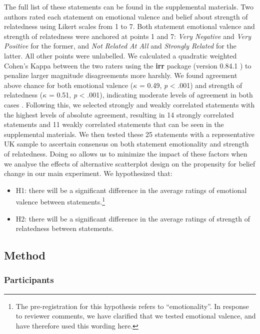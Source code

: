 \documentclass[sigconf]{acmart}
\providecommand{\tightlist}{%
  \setlength{\itemsep}{0pt}\setlength{\parskip}{0pt}}\usepackage{longtable,booktabs,array}
\begin{document}
The full list of these statements can be found in the supplemental
materials. Two authors rated each statement on emotional valence and
belief about strength of relatedness using Likert scales from 1 to 7.
Both statement emotional valence and strength of relatedness were
anchored at points 1 and 7: \emph{Very Negative} and \emph{Very
Positive} for the former, and \emph{Not Related At All} and
\emph{Strongly Related} for the latter. All other points were
unlabelled. We calculated a quadratic weighted Cohen's Kappa between the
two raters using the \textbf{irr} package (version 0.84.1 \citep{irr})
to penalize larger magnitude disagreements more harshly. We found
agreement above chance for both emotional valence (\(\kappa\) = 0.49,
\emph{p} \textless{} .001) and strength of relatedness (\(\kappa\) =
0.51, \emph{p} \textless{} .001), indicating moderate levels of
agreement in both cases \citep{cohen_1968, fleiss_1969}. Following this,
we selected strongly and weakly correlated statements with the highest
levels of absolute agreement, resulting in 14 strongly correlated
statements and 11 weakly correlated statements that can be seen in the
supplemental materials. We then tested these 25 statements with a
representative UK sample to ascertain consensus on both statement
emotionality and strength of relatedness. Doing so allows us to minimize
the impact of these factors when we analyse the effects of alternative
scatterplot design on the propensity for belief change in our main
experiment. We hypothesized that:

\begin{itemize}
\tightlist
\item
  H1: there will be a significant difference in the average ratings of
  emotional valence between statements.\footnote{The pre-registration
    for this hypothesis refers to ``emotionality''. In response to
    reviewer comments, we have clarified that we tested emotional
    valence, and have therefore used this wording here.}
\item
  H2: there will be a significant difference in the average ratings of
  strength of relatedness between statements.
\end{itemize}

\subsection{Method}\label{sec-method-pre}

\subsubsection{Participants}\label{sec-participants-pre}
\end{document}
